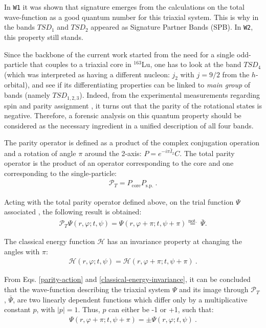 \documentclass[11pt]{article}
\begin{document}
In \texttt{W1} it was shown that signature emerges from the calculations on the total wave-function as a good quantum number for this triaxial system. This is why in \cite{raduta2020approach} the bands $TSD_1$ and $TSD_2$ appeared as Signature Partner Bands (SPB). In \texttt{W2}, this property still stands.

Since the backbone of the current work started from the need for a single odd-particle that couples to a triaxial core in $^{163}$Lu, one has to look at the band $TSD_4$ (which was interpreted as having a different nucleon: $j_2$ with $j=9/2$ from the $h$-orbital), and see if its differentiating properties can be linked to \emph{main group} of bands (namely $TSD_{1,2,3}$). Indeed, from the experimental measurements regarding spin and parity assignment \cite{jensen2004coexisting}, it turns out that the parity of the rotational states is negative. Therefore, a forensic analysis on this quantum property should be considered as the necessary ingredient in a unified description of all four bands.

 The parity operator is defined as a product of the complex conjugation operation and a rotation of angle $\pi$ around the 2-axis: $P=e^{-i\pi\hat{I}_2}C$. The total parity operator is the product of an operator corresponding to the core and one corresponding to the single-particle:
\begin{align}
    \mathcal{P}_T=P_\text{core}P_\text{s.p.}\ .
    \label{parity-operator}
\end{align}

Acting with the total parity operator defined above, on the trial function $\Psi$ associated , the following result is obtained:
\begin{align}
    \mathcal{P}_T\Psi(r,\varphi;t,\psi)=\Psi(r,\varphi+\pi;t,\psi+\pi)\overset{\mathrm{not.}}{=}\ \bar{\Psi}.
    \label{parity-action}
\end{align}

The classical energy function $\mathcal{H}$ has an invariance property at changing the angles with $\pi$:
\begin{align}
    \mathcal{H}(r,\varphi;t,\psi)=\mathcal{H}(r,\varphi+\pi;t,\psi+\pi)\ .
    \label{classical-energy-invariance}
\end{align}

From Eqs. \ref{parity-action} and \ref{classical-energy-invariance}, it can be concluded that the wave-function describing the triaxial system $\Psi$ and its image through $\mathcal{P}_T$ , $\bar{\Psi}$,  are two linearly dependent functions which differ only by a multiplicative constant $p$, with $|p|=1$. Thus, $p$ can either be -1 or +1, such that:
\begin{align}
    \Psi(r,\varphi+\pi;t,\psi+\pi)=\pm\Psi(r,\varphi;t,\psi)\ .
\end{align}
\end{document}

